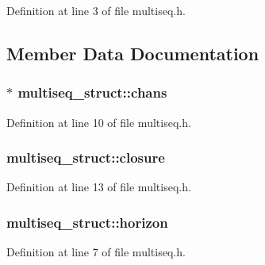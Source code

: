 Definition at line 3 of file multiseq.\+h.



\subsection{Member Data Documentation}
\subsubsection[{\texorpdfstring{chans}{chans}}]{$\ast$ multiseq\+\_\+struct\+::chans}\hypertarget{structmultiseq__struct_aa5939cb8e7c29d76dcafbe47a4425f0f}{}\label{structmultiseq__struct_aa5939cb8e7c29d76dcafbe47a4425f0f}


Definition at line 10 of file multiseq.\+h.

\subsubsection[{\texorpdfstring{closure}{closure}}]{ multiseq\+\_\+struct\+::closure}\hypertarget{structmultiseq__struct_aba2e5a8de28b9dc2ad0c6340da20efbf}{}\label{structmultiseq__struct_aba2e5a8de28b9dc2ad0c6340da20efbf}


Definition at line 13 of file multiseq.\+h.

\subsubsection[{\texorpdfstring{horizon}{horizon}}]{ multiseq\+\_\+struct\+::horizon}\hypertarget{structmultiseq__struct_a6271d06189f60f3432c9733c74b937ea}{}\label{structmultiseq__struct_a6271d06189f60f3432c9733c74b937ea}


Definition at line 7 of file multiseq.\+h.

